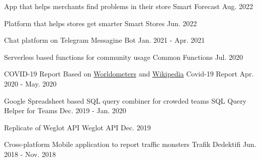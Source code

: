 

\begin{cventries}

  \cventry
    {App that helps merchants find problems in their store} %
    {Smart Forecast} %
    {} %
    {Aug. 2022} %
    {}

  \cventry
    {Platform that helps stores get smarter} %
    {Smart Stores} %
    {} %
    {Jun. 2022} %
    {}

  \cventry
    {Chat platform on Telegram} %
    {Messagine Bot} %
    {} %
    {Jan. 2021 - Apr. 2021} %
    {}

  \cventry
    {Serverless based functions for community usage} %
    {Common Functions} %
    {} %
    {Jul. 2020} %
    {}

  \cventry
    {COVID-19 Report Based on \href{https://www.worldometers.info/coronavirus}{Worldometers} and \href{https://en.wikipedia.org/wiki/COVID-19_pandemic}{Wikipedia}} %
    {Covid-19 Report} %
    {} %
    {Apr. 2020 - May. 2020} %
    {}

  \cventry
    {Google Spreadsheet based SQL query combiner for crowded teams} %
    {SQL Query Helper for Teams} %
    {} %
    {Dec. 2019 - Jan. 2020} %
    {}

  \cventry
    {Replicate of Weglot API} %
    {Weglot API} %
    {} %
    {Dec. 2019} %
    {}

  \cventry
    {Cross-platform Mobile application to report traffic monsters} %
    {Trafik Dedektifi} %
    {} %
    {Jun. 2018 - Nov. 2018} %
    {}


\end{cventries}
